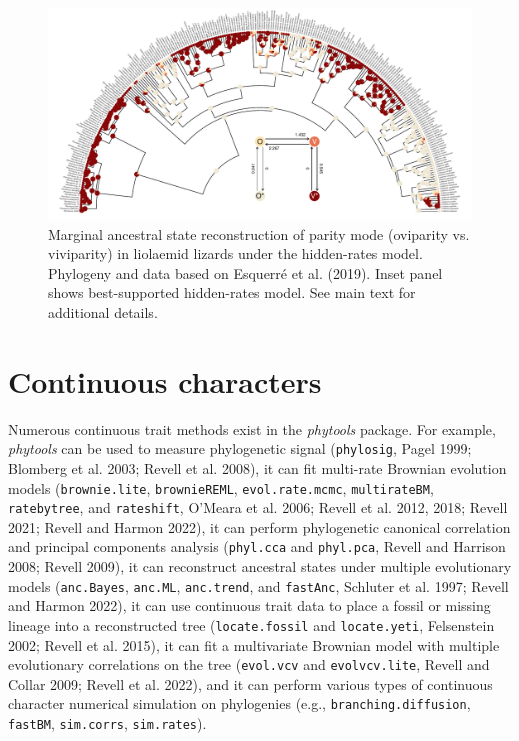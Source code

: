 \documentclass[fleqn,10pt,lineno]{wlpeerj} %
\begin{document}
\begin{figure}
\includegraphics[width=1\linewidth]{Revell.phytools-v2_peerj_files/figure-latex/fig09-anc-fitHRM-1} \caption{Marginal ancestral state reconstruction of parity mode (oviparity vs. viviparity) in liolaemid lizards under the hidden-rates model. Phylogeny and data based on Esquerr\'e et al. (2019). Inset panel shows best-supported hidden-rates model. See main text for additional details.}\label{fig:fig09-anc-fitHRM}
\end{figure}

\hypertarget{continuous-characters}{%
\section{Continuous characters}\label{continuous-characters}}

Numerous continuous trait methods exist in the \emph{phytools} package. For example, \emph{phytools} can be used to measure phylogenetic signal (\texttt{phylosig}, Pagel 1999; Blomberg et al. 2003; Revell et al. 2008), it can fit multi-rate Brownian evolution models (\texttt{brownie.lite}, \texttt{brownieREML}, \texttt{evol.rate.mcmc}, \texttt{multirateBM}, \texttt{ratebytree}, and \texttt{rateshift}, O'Meara et al. 2006; Revell et al. 2012, 2018; Revell 2021; Revell and Harmon 2022), it can perform phylogenetic canonical correlation and principal components analysis (\texttt{phyl.cca} and \texttt{phyl.pca}, Revell and Harrison 2008; Revell 2009), it can reconstruct ancestral states under multiple evolutionary models (\texttt{anc.Bayes}, \texttt{anc.ML}, \texttt{anc.trend}, and \texttt{fastAnc}, Schluter et al. 1997; Revell and Harmon 2022), it can use continuous trait data to place a fossil or missing lineage into a reconstructed tree (\texttt{locate.fossil} and \texttt{locate.yeti}, Felsenstein 2002; Revell et al. 2015), it can fit a multivariate Brownian model with multiple evolutionary correlations on the tree (\texttt{evol.vcv} and \texttt{evolvcv.lite}, Revell and Collar 2009; Revell et al. 2022), and it can perform various types of continuous character numerical simulation on phylogenies (e.g., \texttt{branching.diffusion}, \texttt{fastBM}, \texttt{sim.corrs}, \texttt{sim.rates}).
\end{document}
